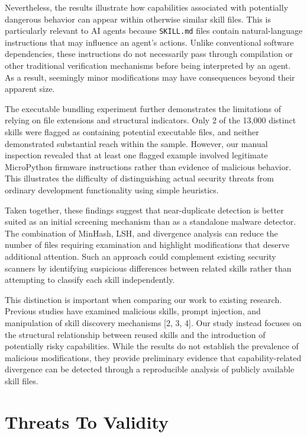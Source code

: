 \documentclass[sigconf,review]{acmart}
\begin{document}
Nevertheless, the results illustrate how capabilities associated with potentially dangerous behavior can appear within otherwise similar skill files. This is particularly relevant to AI agents because \texttt{SKILL.md} files contain natural-language instructions that may influence an agent's actions. Unlike conventional software dependencies, these instructions do not necessarily pass through compilation or other traditional verification mechanisms before being interpreted by an agent. As a result, seemingly minor modifications may have consequences beyond their apparent size.

The executable bundling experiment further demonstrates the limitations of relying on file extensions and structural indicators. Only 2 of the 13,000 distinct skills were flagged as containing potential executable files, and neither demonstrated substantial reach within the sample. However, our manual inspection revealed that at least one flagged example involved legitimate MicroPython firmware instructions rather than evidence of malicious behavior. This illustrates the difficulty of distinguishing actual security threats from ordinary development functionality using simple heuristics.

Taken together, these findings suggest that near-duplicate detection is better suited as an initial screening mechanism than as a standalone malware detector. The combination of MinHash, LSH, and divergence analysis can reduce the number of files requiring examination and highlight modifications that deserve additional attention. Such an approach could complement existing security scanners by identifying suspicious differences between related skills rather than attempting to classify each skill independently.

This distinction is important when comparing our work to existing research. Previous studies have examined malicious skills, prompt injection, and manipulation of skill discovery mechanisms [2, 3, 4]. Our study instead focuses on the structural relationship between reused skills and the introduction of potentially risky capabilities. While the results do not establish the prevalence of malicious modifications, they provide preliminary evidence that capability-related divergence can be detected through a reproducible analysis of publicly available skill files.

\section{Threats To Validity}
\label{Section:Threats}
\end{document}
